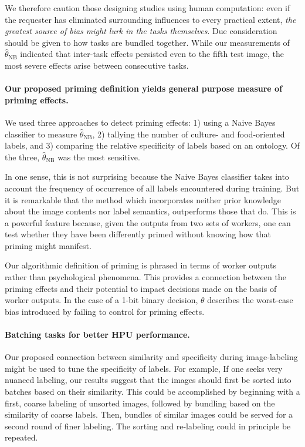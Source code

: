 \documentclass[letterpaper]{article}
\begin{document}
We therefore caution those designing studies using human computation: even if 
the requester has eliminated surrounding influences to every practical extent, 
\textit{the greatest source of bias might lurk in the tasks themselves}.
Due consideration should be given to how tasks are bundled together.
While our measurements of $\hat{\theta}_\text{NB}$ indicated that inter-task 
effects persisted even to the fifth test image, the most severe effects arise 
between consecutive tasks.
\paragraph{Our proposed priming definition yields general purpose measure of priming effects.}
We used three approaches to detect priming effects: 1) using a Naive Bayes
classifier to measure $\hat{\theta}_\text{NB}$, 2) tallying the number of 
culture- and food-oriented labels, and 3) comparing the relative specificity
of labels based on an ontology.  Of the three, $\hat{\theta}_\text{NB}$ was 
the most sensitive.  

In one sense, this is not surprising because the Naive 
Bayes classifier takes into account the frequency of occurrence of all labels 
encountered during training.  But it is remarkable that the 
method which incorporates neither prior knowledge about the image contents nor 
label semantics, outperforms those that do.  This is a powerful feature 
because, given the outputs from two sets of workers, one can test whether they 
have been differently primed without knowing how that priming might manifest.

Our algorithmic definition of priming is phrased in terms of worker outputs
rather than psychological phenomena.  This provides a connection between
the priming effects and their potential to impact decisions made on the basis
of worker outputs.  In the case of a 1-bit binary decision, $\theta$
describes the worst-case bias introduced by failing to control for priming 
effects.
\paragraph{Batching tasks for better HPU performance.}
Our proposed connection between similarity and specificity during 
image-labeling might be used to tune the specificity of labels.  For example,
If one seeks very nuanced labeling, our results suggest that the images 
should first be sorted into batches based on their similarity. This could be 
accomplished by beginning with a first, coarse labeling of unsorted 
images, followed by bundling based on the similarity of coarse labels. Then, 
bundles of similar images could be served for a second round of finer 
labeling.  The sorting and re-labeling could in principle be repeated.  
\end{document}
